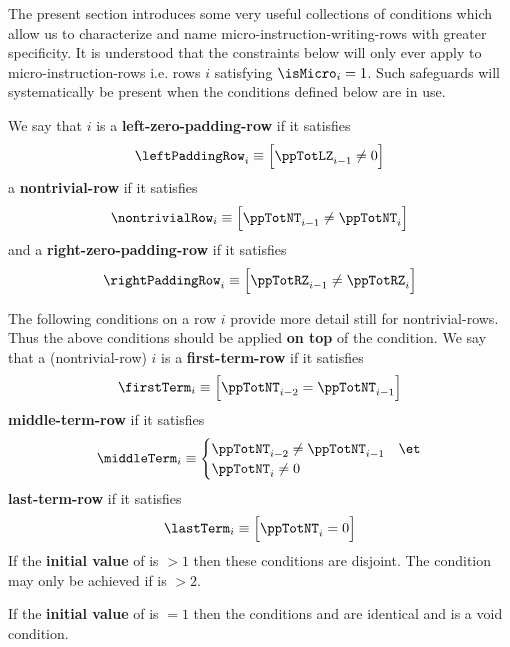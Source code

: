 The present section introduces some very useful collections of conditions which allow us to characterize and name micro-instruction-writing-rows with greater specificity.
It is understood that the constraints below will only ever apply to micro-instruction-rows i.e. rows $i$ satisfying $\isMicro_{i} = 1$.
Such safeguards will systematically be present when the conditions defined below are in use.

We say that $i$ is a
\textbf{left-zero-padding-row} if it satisfies
\[
	\leftPaddingRow_{i} \equiv \Big[\ppTotLZ_{i - 1} \neq 0 \Big]
\]
a \textbf{nontrivial-row} if it satisfies
\[
	\nontrivialRow_{i} \equiv \Big[\ppTotNT_{i - 1} \neq \ppTotNT_{i} \Big]
\]
and a \textbf{right-zero-padding-row} if it satisfies
\[
	\rightPaddingRow_{i} \equiv \Big[\ppTotRZ_{i - 1} \neq \ppTotRZ_{i} \Big]
\]

The following conditions on a row $i$ provide more detail still for nontrivial-rows.
Thus the above conditions should be applied \textbf{on top} of the \nontrivialRow{} condition.
We say that a (nontrivial-row) $i$ is a
\textbf{first-term-row}  if it satisfies
\[
	\firstTerm_{i} 
	\equiv 
	\Big[ \ppTotNT_{i - 2} = \ppTotNT_{i - 1} \Big]
\]
\textbf{middle-term-row}  if it satisfies
\[
	\middleTerm_{i}
	\equiv 
	\begin{cases}
		\ppTotNT_{i - 2} \neq \ppTotNT_{i - 1}  & \et \\
		\ppTotNT_{i}     \neq 0 & \\
	\end{cases}
\]
\textbf{last-term-row}  if it satisfies
\[
	\lastTerm_{i}
	\equiv 
	\Big[ \ppTotNT_{i} = 0 \Big]
\]
\saNote{}
If the \textbf{initial value} of \ppTotNT{} is $>1$ then these conditions are disjoint.
The condition \middleTerm{} may only be achieved if \ppTotNT{} is $>2$.

\saNote{}
If the \textbf{initial value} of \ppTotNT{} is $=1$ then the conditions
\firstTerm{} and \lastTerm{} are identical and \nontrivialRow{} is a void condition.

